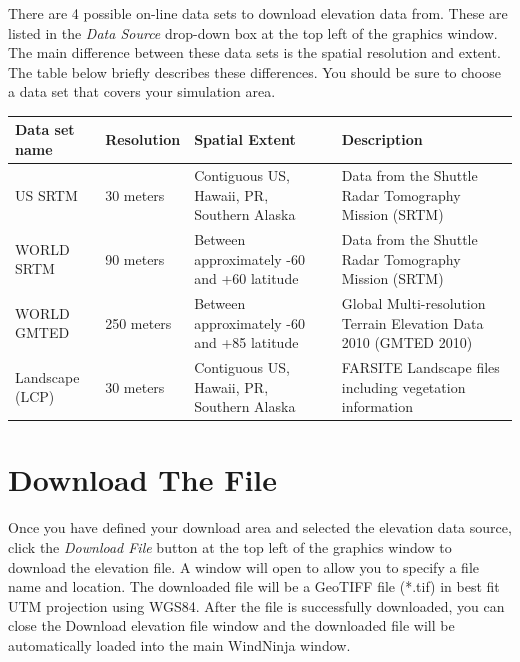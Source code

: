 \documentclass[12pt]{article}
\begin{document}
There are 4 possible on-line data sets to download elevation data from.  These are listed in the \textit{Data Source} drop-down box at the top left of the graphics window.  The main difference between these data sets is the spatial resolution and extent.  The table below briefly describes these differences.  You should be sure to choose a data set that covers your simulation area.

\begin{center}
    \begin{tabular}{| l | l | p{1.75in} | p{1.8in} |}
    \hline
    Data set name & Resolution & Spatial Extent & Description \\ \hline

    US SRTM & 30 meters  & Contiguous US, Hawaii, PR, Southern Alaska &
    Data from the Shuttle Radar Tomography Mission (SRTM) \\ \hline

    WORLD SRTM & 90 meters & Between approximately -60 and +60 latitude &
    Data from the Shuttle Radar Tomography Mission (SRTM) \\ \hline

    WORLD GMTED & 250 meters & Between approximately -60 and +85 latitude &
    Global Multi-resolution Terrain Elevation Data 2010 (GMTED 2010) \\ \hline

    Landscape (LCP) & 30 meters & Contiguous US, Hawaii, PR, Southern Alaska &
    FARSITE Landscape files including vegetation information \\ \hline
\end{tabular}
\end{center}


\section*{Download The File}
Once you have defined your download area and selected the elevation data source, click the \textit{Download File} button at the top left of the graphics window to download the elevation file.  A window will open to allow you to specify a file name and location. The downloaded file will be a GeoTIFF file (*.tif) in best fit UTM projection using WGS84. After the file is successfully downloaded, you can close the Download elevation file window and the downloaded file will be automatically loaded into the main WindNinja window.
\end{document}
